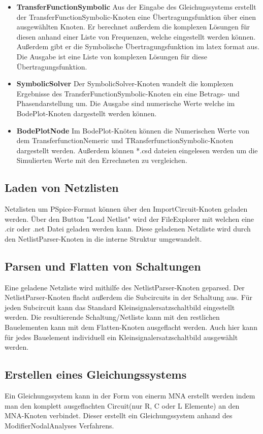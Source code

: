 \begin{itemize}
    \item \textbf{TransferFunctionSymbolic} Aus der Eingabe des Gleichugssystems erstellt der TransferFunctionSymbolic-Knoten eine Übertragungsfunktion über einen ausgewählten Knoten. Er berechnet außerdem die komplexen Lösungen für diesen anhand einer Liste von Frequenzen, welche eingestellt werden können. Außerdem gibt er die Symbolische Übertragungsfunktion im latex format aus. Die Ausgabe ist eine Liste von komplexen Lösungen für diese Übertragungsfunktion.
    \item \textbf{SymbolicSolver} Der SymbolicSolver-Knoten wandelt die komplexen Ergebnisse des TransferFunctionSymbolic-Knoten ein eine Betrags- und Phasendarstellung um. Die Ausgabe sind numerische Werte welche im BodePlot-Knoten dargestellt werden können.
    \item \textbf{BodePlotNode} Im BodePlot-Knöten können die Numerischen Werte von dem TransferfunctionNemeric und TRansferfunctionSymbolic-Knoten dargestellt werden. Außerdem können *.csd dateien eingelesen werden um die Simulierten Werte mit den Errechneten zu vergleichen.
\end{itemize}

\subsection{Laden von Netzlisten}
Netzlisten um PSpice-Format können über den ImportCircuit-Knoten geladen werden. Über den Button "Load Netlist" wird der FileExplorer mit welchen eine .cir oder .net Datei geladen werden kann. Diese geladenen Netzliste wird durch den NetlistParser-Knoten in die interne Struktur umgewandelt.

\subsection{Parsen und Flatten von Schaltungen}
Eine geladene Netzliste wird mithilfe des NetlistParser-Knoten geparsed. Der NetlistParser-Knoten flacht außerdem die Subcircuits in der Schaltung aus. Für jeden Subcircuit kann das Standard Kleinsignalersatzschaltbild eingestellt werden. Die resultierende Schaltung/Netliste kann mit den restlichen Bauelementen kann mit dem Flatten-Knoten ausgeflacht werden. Auch hier kann für jedes Bauelement individuell ein Kleinsignalersatzschaltbild ausgewählt werden.

\subsection{Erstellen eines Gleichungssystems}
Ein Gleichungssystem kann in der Form von einerm MNA erstellt werden indem man den komplett ausgeflachten Circuit(nur R, C oder L Elemente) an den MNA-Knoten verbindet. Dieser erstellt ein Gleichungssystem anhand des ModifierNodalAnalyses Verfahrens.

